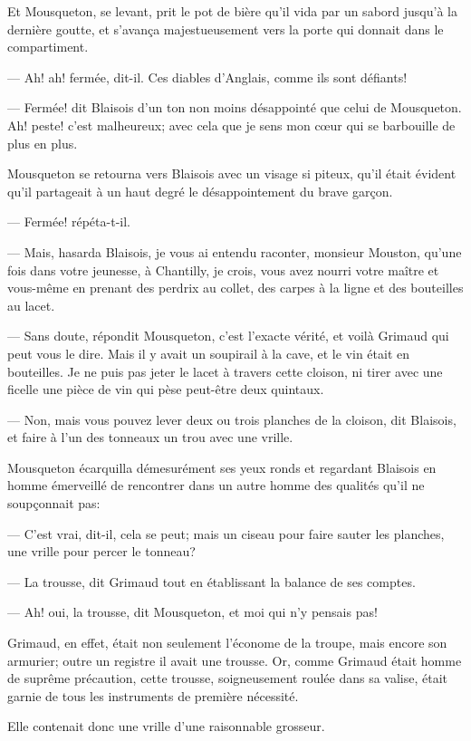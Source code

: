 Et Mousqueton, se levant, prit le pot de bière qu'il vida par un sabord jusqu'à la dernière goutte, et s'avança majestueusement vers la porte qui donnait dans le compartiment.

— Ah! ah! fermée, dit-il. Ces diables d'Anglais, comme ils sont défiants!

— Fermée! dit Blaisois d'un ton non moins désappointé que celui de Mousqueton. Ah! peste! c'est malheureux; avec cela que je sens mon cœur qui se barbouille de plus en plus.

Mousqueton se retourna vers Blaisois avec un visage si piteux, qu'il était évident qu'il partageait à un haut degré le désappointement du brave garçon.

— Fermée! répéta-t-il.

— Mais, hasarda Blaisois, je vous ai entendu raconter, monsieur Mouston, qu'une fois dans votre jeunesse, à Chantilly, je crois, vous avez nourri votre maître et vous-même en prenant des perdrix au collet, des carpes à la ligne et des bouteilles au lacet.

— Sans doute, répondit Mousqueton, c'est l'exacte vérité, et voilà Grimaud qui peut vous le dire. Mais il y avait un soupirail à la cave, et le vin était en bouteilles. Je ne puis pas jeter le lacet à travers cette cloison, ni tirer avec une ficelle une pièce de vin qui pèse peut-être deux quintaux.

— Non, mais vous pouvez lever deux ou trois planches de la cloison, dit Blaisois, et faire à l'un des tonneaux un trou avec une vrille.

Mousqueton écarquilla démesurément ses yeux ronds et regardant Blaisois en homme émerveillé de rencontrer dans un autre homme des qualités qu'il ne soupçonnait pas:

— C'est vrai, dit-il, cela se peut; mais un ciseau pour faire sauter les planches, une vrille pour percer le tonneau?

— La trousse, dit Grimaud tout en établissant la balance de ses comptes.

— Ah! oui, la trousse, dit Mousqueton, et moi qui n'y pensais pas!

Grimaud, en effet, était non seulement l'économe de la troupe, mais encore son armurier; outre un registre il avait une trousse. Or, comme Grimaud était homme de suprême précaution, cette trousse, soigneusement roulée dans sa valise, était garnie de tous les instruments de première nécessité.

Elle contenait donc une vrille d'une raisonnable grosseur.

